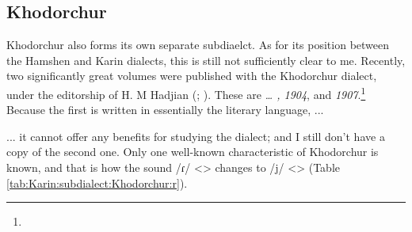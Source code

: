 \subsection{Khodorchur}
Khodorchur also forms its own separate subdiaelct. As for its position between the Hamshen and Karin dialects, this is still not sufficiently clear to me. Recently, two significantly great volumes were published with the Khodorchur dialect, under the editorship of H. M Hadjian (; ). These are \textit{… , 1904}, and \textit{ 1907}.\footnote{} Because the first is written in essentially the literary language, ... 


\begin{adjarianpage}\label{page:113}\end{adjarianpage}%

... it cannot offer any benefits for studying the dialect; and I still don't have a copy of the second one. Only one well-known characteristic of Khodorchur is known, and that is how the sound /ɾ/ <> changes to /j/ <> (Table \ref{tab:Karin:subdialect:Khodorchur:r}). 

\begin{table}[H]
	\centering
	\caption{Change from Classical Armenian /ɾ/ <> to /j/ <> in the Khodorchur subdialect of the Karin dialect}
	\label{tab:Karin:subdialect:Khodorchur:r}
\end{table}


